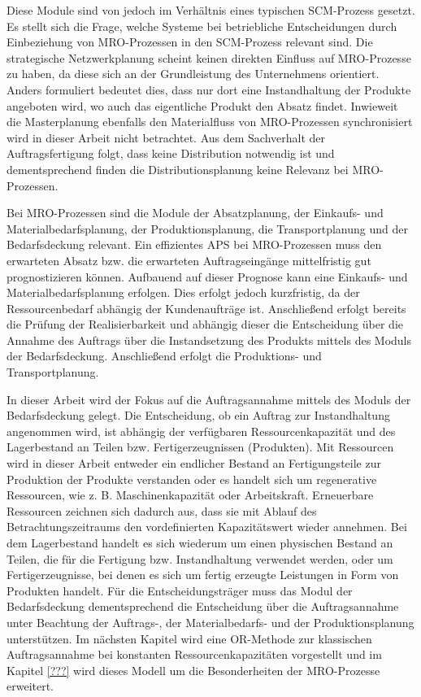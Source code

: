 Diese Module sind von \cite{meyr2015structure} jedoch im Verhältnis eines typischen SCM-Prozess gesetzt. Es stellt sich die Frage, welche Systeme bei betriebliche Entscheidungen durch Einbeziehung von MRO-Prozessen in den SCM-Prozess relevant sind. Die strategische Netzwerkplanung scheint keinen direkten Einfluss auf MRO-Prozesse zu haben, da diese sich an der Grundleistung des Unternehmens orientiert. Anders formuliert bedeutet dies, dass nur dort eine Instandhaltung der Produkte angeboten wird, wo auch das eigentliche Produkt den Absatz findet. Inwieweit die Masterplanung ebenfalls den Materialfluss von MRO-Prozessen synchronisiert wird in dieser Arbeit nicht betrachtet. Aus dem Sachverhalt der Auftragsfertigung folgt, dass keine Distribution notwendig ist und dementsprechend finden die Distributionsplanung keine Relevanz bei MRO-Prozessen.

Bei MRO-Prozessen sind die Module der Absatzplanung, der Einkaufs- und Materialbedarfsplanung, der Produktionsplanung, die Transportplanung und der Bedarfsdeckung relevant. Ein effizientes APS bei MRO-Prozessen muss den erwarteten Absatz bzw. die erwarteten Auftragseingänge mittelfristig gut prognostizieren können. Aufbauend auf dieser Prognose kann eine Einkaufs- und Materialbedarfsplanung erfolgen. Dies erfolgt jedoch kurzfristig, da der Ressourcenbedarf abhängig der Kundenaufträge ist. Anschließend erfolgt bereits die Prüfung der Realisierbarkeit und abhängig dieser die Entscheidung über die Annahme des Auftrags über die Instandsetzung des Produkts mittels des Moduls der Bedarfsdeckung. Anschließend erfolgt die Produktions- und Transportplanung.

In dieser Arbeit wird der Fokus auf die Auftragsannahme mittels des Moduls der Bedarfsdeckung gelegt. Die Entscheidung, ob ein Auftrag zur Instandhaltung angenommen wird, ist abhängig der verfügbaren Ressourcenkapazität und des Lagerbestand an Teilen bzw. Fertigerzeugnissen (Produkten). %
Mit Ressourcen wird in dieser Arbeit entweder ein endlicher Bestand an Fertigungsteile zur Produktion der Produkte verstanden oder es handelt sich um regenerative Ressourcen, wie z. B. Maschinenkapazität oder Arbeitskraft. Erneuerbare Ressourcen zeichnen sich dadurch aus, dass sie mit Ablauf des Betrachtungszeitraums den vordefinierten Kapazitätswert wieder annehmen. Bei dem Lagerbestand handelt es sich wiederum um einen physischen Bestand an Teilen, die für die Fertigung bzw. Instandhaltung verwendet werden, oder um Fertigerzeugnisse, bei denen es sich um fertig erzeugte Leistungen in Form von Produkten handelt. Für die Entscheidungsträger muss das Modul der Bedarfsdeckung dementsprechend die Entscheidung über die Auftragsannahme unter Beachtung der Auftrags-, der Materialbedarfs- und der Produktionsplanung unterstützen. Im nächsten Kapitel wird eine OR-Methode zur klassischen Auftragsannahme bei konstanten Ressourcenkapazitäten vorgestellt und im Kapitel \ref{???} wird dieses Modell um die Besonderheiten der MRO-Prozesse erweitert.





